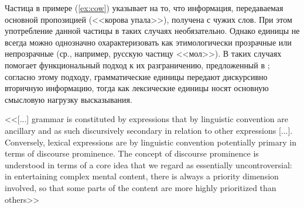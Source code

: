 
Частица в примере (\ref{ex:cow}) указывает на то, что информация, передаваемая основной пропозицией (<<корова упала>>), получена с чужих слов. При этом употребление данной частицы в таких случаях необязательно. Однако единицы не всегда можно однозначно охарактеризовать как этимологически прозрачные или непрозрачные (ср., например, русскую частицу <<мол>>). В таких случаях помогает функциональный подход к их разграничению, предложенный в \citep{boyeharder2012}; согласно этому подходу, грамматические единицы передают дискурсивно вторичную информацию, тогда как лексические единицы носят основную смысловую нагрузку высказывания. 


\begin{displayquote}
<<[...] grammar is constituted by expressions that by linguistic convention are ancillary and as such discursively secondary in relation to other expressions [...]. Conversely, lexical expressions are by linguistic convention potentially primary in terms of discourse prominence. The concept of discourse prominence is understood in terms of a core idea that we regard as essentially uncontroversial: in entertaining complex mental content, there is always a priority dimension involved, so that some parts of the content are more highly prioritized than others>>\\
\citep[2]{boyeharder2012}
\end{displayquote}

